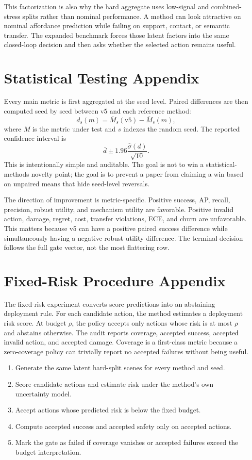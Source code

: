 \documentclass{article}
\begin{document}
This factorization is also why the hard aggregate uses low-signal and combined-stress splits rather than nominal performance. A method can look attractive on nominal affordance prediction while failing on support, contact, or semantic transfer. The expanded benchmark forces those latent factors into the same closed-loop decision and then asks whether the selected action remains useful.

\section{Statistical Testing Appendix}
Every main metric is first aggregated at the seed level. Paired differences are then computed seed by seed between v5 and each reference method:
\[
  d_s(m) = \bar{M}_s(\text{v5}) - \bar{M}_s(m),
\]
where $M$ is the metric under test and $s$ indexes the random seed. The reported confidence interval is
\[
  \bar{d} \pm 1.96\frac{\widehat{\sigma}(d)}{\sqrt{10}}.
\]
This is intentionally simple and auditable. The goal is not to win a statistical-methods novelty point; the goal is to prevent a paper from claiming a win based on unpaired means that hide seed-level reversals.

The direction of improvement is metric-specific. Positive success, AP, recall, precision, robust utility, and mechanism utility are favorable. Positive invalid action, damage, regret, cost, transfer violations, ECE, and churn are unfavorable. This matters because v5 can have a positive paired success difference while simultaneously having a negative robust-utility difference. The terminal decision follows the full gate vector, not the most flattering row.

\section{Fixed-Risk Procedure Appendix}
The fixed-risk experiment converts score predictions into an abstaining deployment rule. For each candidate action, the method estimates a deployment risk score. At budget $\rho$, the policy accepts only actions whose risk is at most $\rho$ and abstains otherwise. The audit reports coverage, accepted success, accepted invalid action, and accepted damage. Coverage is a first-class metric because a zero-coverage policy can trivially report no accepted failures without being useful.

\begin{enumerate}
\item Generate the same latent hard-split scenes for every method and seed.
\item Score candidate actions and estimate risk under the method's own uncertainty model.
\item Accept actions whose predicted risk is below the fixed budget.
\item Compute accepted success and accepted safety only on accepted actions.
\item Mark the gate as failed if coverage vanishes or accepted failures exceed the budget interpretation.
\end{enumerate}
\end{document}
